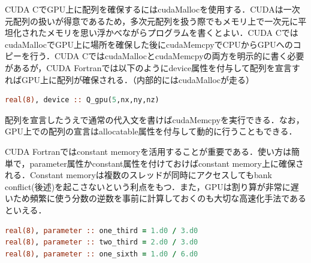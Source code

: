 CUDA CでGPU上に配列を確保するにはcudaMallocを使用する．CUDAは一次元配列の扱いが得意であるため，多次元配列を扱う際でもメモリ上で一次元に平坦化されたメモリを思い浮かべながらプログラムを書くとよい．CUDA CではcudaMallocでGPU上に場所を確保した後にcudaMemcpyでCPUからGPUへのコピーを行う．CUDA CではcudaMallocとcudaMemcpyの両方を明示的に書く必要があるが，CUDA Fortranでは以下のようにdevice属性を付与して配列を宣言すればGPU上に配列が確保される．（内部的にはcudaMallocが走る）

\begin{lstlisting}[language=Fortran]
real(8), device :: Q_gpu(5,nx,ny,nz)
\end{lstlisting}

\noindent
配列を宣言したうえで通常の代入文を書けばcudaMemcpyを実行できる．なお，GPU上での配列の宣言はallocatable属性を付与して動的に行うこともできる．

CUDA Fortranではconstant memoryを活用することが重要である．使い方は簡単で，parameter属性かconstant属性を付けておけばconstant memory上に確保される．Constant memoryは複数のスレッドが同時にアクセスしてもbank conflict(後述)を起こさないという利点をもつ．また，GPUは割り算が非常に遅いため頻繁に使う分数の逆数を事前に計算しておくのも大切な高速化手法であるといえる．

\begin{lstlisting}[language=Fortran]
real(8), parameter :: one_third = 1.d0 / 3.d0
real(8), parameter :: two_third = 2.d0 / 3.d0
real(8), parameter :: one_sixth = 1.d0 / 6.d0
\end{lstlisting}
